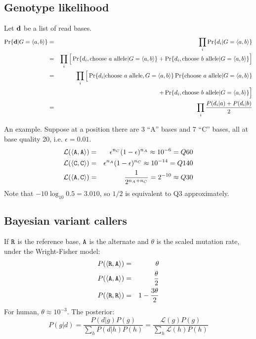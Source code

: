 \documentclass[10pt]{article}
\begin{document}
\subsection{Genotype likelihood}
Let ${\bf d}$ be a list of read bases.
\begin{eqnarray*}
\Pr\{{\bf d}|G=\langle a,b\rangle\}
&=&\prod_i\Pr\{d_i|G=\langle a,b\rangle\}\\
&=&\prod_i\Big[\Pr\{d_i,\mbox{choose $a$ allele}|G=\langle a,b\rangle\}+\Pr\{d_i,\mbox{choose $b$ allele}|G=\langle a,b\rangle\}\Big]\\
&=&\prod_i\Big[\Pr\{d_i|\mbox{choose $a$ allele},G=\langle a,b\rangle\}\Pr\{\mbox{choose $a$ allele}|G=\langle a,b\rangle\}\\
&&+\Pr\{d_i,\mbox{choose $b$ allele}|G=\langle a,b\rangle\}\Big]\\
&=&\prod_i\frac{P(d_i|a)+P(d_i|b)}{2}
\end{eqnarray*}

An example. Suppose at a position there are 3 ``A'' bases and 7 ``C'' bases,
all at base quality 20, i.e. $\epsilon=0.01$.
\begin{eqnarray*}
\mathcal{L}(\langle{\tt A},{\tt A}\rangle)&=&\epsilon^{n_C}(1-\epsilon)^{n_A}\approx10^{-6}=Q60\\
\mathcal{L}(\langle{\tt C},{\tt C}\rangle)&=&\epsilon^{n_A}(1-\epsilon)^{n_C}\approx10^{-14}=Q140\\
\mathcal{L}(\langle{\tt A},{\tt C}\rangle)&=&\frac{1}{2^{n_A+n_C}}=2^{-10}\approx Q30
\end{eqnarray*}
Note that $-10\log_{10}0.5=3.010$, so $1/2$ is equivalent to Q3 approximately.

\subsection{Bayesian variant callers}
If ${\tt R}$ is the reference base, ${\tt A}$ is the alternate and $\theta$ is
the scaled mutation rate, under the Wright-Fisher model:
\begin{eqnarray*}
P(\langle{\tt R},{\tt A}\rangle)&=&\theta\\
P(\langle{\tt A},{\tt A}\rangle)&=&\frac{\theta}{2}\\
P(\langle{\tt R},{\tt R}\rangle)&=&1-\frac{3\theta}{2}\\
\end{eqnarray*}
For human, $\theta\approx10^{-3}$. The posterior:
$$
P(g|d)=\frac{P(d|g)P(g)}{\sum_hP(d|h)P(h)}=\frac{\mathcal{L}(g)P(g)}{\sum_h\mathcal{L}(h)P(h)}
$$
\end{document}
